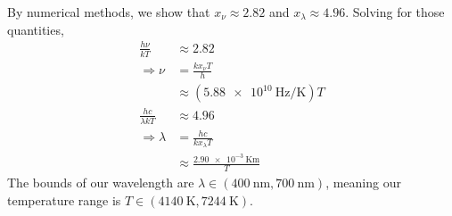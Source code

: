 \documentclass{article}
\begin{document}
By numerical methods, we show that \(x_\nu \approx \num{2.82}\) and \(x_\lambda \approx \num{4.96}\).
Solving for those quantities,
\begin{align}
    \frac{h \nu}{k T} &\approx \num{2.82} \\
    \Rightarrow \nu &= \frac{k x_\nu T}{h} \\
    &\approx (\SI{5.88e+10}{\hertz\per\kelvin})T \\
    \frac{h c}{\lambda k T} &\approx \num{4.96} \\
    \Rightarrow \lambda &= \frac{h c}{k x_\lambda T} \\
    &\approx \frac{\SI{2.90e-3}{\kelvin\meter}}{T}
\end{align}
The bounds of our wavelength are \(\lambda \in (\SI{400}{\nano\meter}, \SI{700}{\nano\meter})\), meaning our temperature range is \(T \in (\SI{4140}{\kelvin}, \SI{7244}{\kelvin})\).
\end{document}
